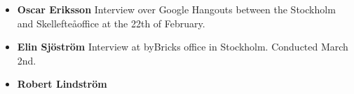 
\begin{itemize}
  \item\textbf{Oscar Eriksson} Interview over Google Hangouts between the Stockholm and Skellefte\aa office at the 22th of February.
  \item  \textbf{Elin Sj\"ostr\"om} Interview at byBricks office in Stockholm. Conducted March 2nd.
  \item\textbf{Robert Lindstr\"om}

\end{itemize}
